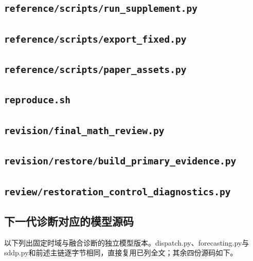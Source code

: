 
\subsection*{\texttt{reference/scripts/run\_supplement.py}}


\subsection*{\texttt{reference/scripts/export\_fixed.py}}


\subsection*{\texttt{reference/scripts/paper\_assets.py}}


\subsection*{\texttt{reproduce.sh}}


\subsection*{\texttt{revision/final\_math\_review.py}}


\subsection*{\texttt{revision/restore/build\_primary\_evidence.py}}
\subsection*{\texttt{review/restoration\_control\_diagnostics.py}}

\subsection*{下一代诊断对应的模型源码}
以下列出固定时域与融合诊断的独立模型版本。dispatch.py、forecasting.py与sddp.py和前述主链逐字节相同，直接复用已列全文；其余四份源码如下。
